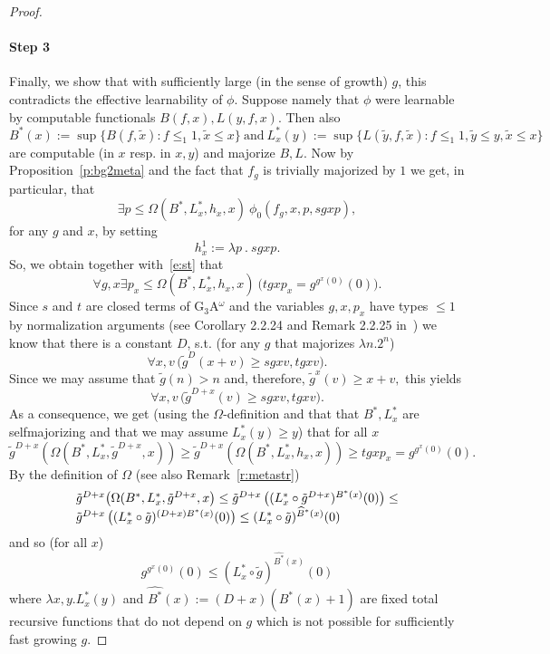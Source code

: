 \begin{proof}
\paragraph{Step 3} Finally, we show that with sufficiently large (in the sense of growth) $g$, this contradicts the effective learnability of $\phi$. Suppose namely that $\phi$ were learnable by computable functionals $B(f,x),L(y,f,x).$ 
Then also 
\[ B^*(x):=\sup \{ B(f,\tilde{x}): f\le_1 1, \tilde{x}\le x\} \ 
\mbox{and} \ 
L^*_x(y):=\sup \{ L(\tilde{y},f,\tilde{x}): f\le_1 1,\tilde{y}\le y,
\tilde{x}\le x\} \] 
are computable (in $x$ resp. in $x,y$) and majorize $B,L.$ 
Now by Proposition~\ref{p:bg2meta} and the fact that $f_g$ is trivially 
majorized by $1$ we get, in particular, that 
\[
\exists p\leq \Omega(B^*,L^*_x,h_x,x)\ \phi_0(f_g,x,p, sgxp),
\]
for any $g$ and $x$, by setting \[h^1_x:=\lambda p\ .\ sgxp.\]
So, we obtain together with~\eqref{e:st} that
\[
\forall g,x \exists p_x\leq \Omega(B^*,L^*_x,h_x,x)\ 
\big( tgxp_x =g^{g^{x}(0)}(0)\big).
\]
Since $s$ and $t$ are closed terms of G$_3$A$^\omega$ and the variables 
$g,x,p_x$ have types $\le 1$ by normalization arguments
(see Corollary 2.2.24 and Remark 2.2.25 in~\cite{Kohlenbach(lowrate)}) we know that there is 
a constant $D$, s.t. (for any $g$ that majorizes $\lambda n.2^n$) 
\[ \forall x,v\, \big( \tilde{g}^D(x+v)\ge sgxv,tgxv\big).\] 
Since we may assume that $\tilde{g}(n)>n$ and, therefore, 
$\tilde{g}^x(v)\ge x+v,$ this yields 
\[ \forall x,v\,\big( \tilde{g}^{D+x}(v)\ge sgxv,tgxv\big). \]
As a consequence, we get (using the $\Omega$-definition 
and that that $B^*,L^*_x$ are selfmajorizing and that we may 
assume $L^*_x(y)\ge y$) 
that for all $x$  
\[ \tilde{g}^{D+x}\left(\Omega(B^*,L^*_x,\tilde{g}^{D+x},x)\right) \ge 
\tilde{g}^{D+x}\left(\Omega(B^*,L^*_x,h_x,x)\right) \ge 
tgxp_x=g^{g^x(0)}(0). \]
By the definition of $\Omega$ (see also Remark~\ref{r:metastr}) 
\[   \ba{l} \tilde{g}^{D+x}\big(\Omega(B^*,L^*_x,\tilde{g}^{D+x},x\big)\le 
\tilde{g}^{D+x}
\left((L^*_x\circ\tilde{g}^{D+x})^{B^*(x)}(0)\right) \le \\ 
\tilde{g}^{D+x}\left((L^*_x\circ\tilde{g})^{(D+x)B^*(x)}(0)\right)\le 
(L^*_x\circ \tilde{g})^{\widehat{B}^*(x)}(0)\ea \] 
and so (for all $x$)
\[  g^{g^x(0)}(0)\le (L^*_x\circ \tilde{g})^{\widehat{B^*}(x)}(0) \]
where $\lambda x,y.L^*_x(y)$ and $\widehat{B^*}(x):=(D+x)(B^*(x)+1)$ 
are fixed total recursive functions that do not depend 
on $g$ which is not possible for sufficiently fast growing $g$.
\end{proof}

